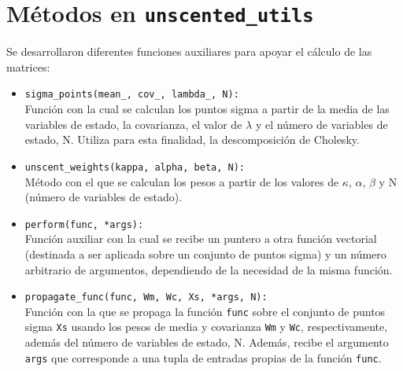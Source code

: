 \begin{appendix}
\begin{itemize}
\end{itemize} 
\pagebreak

\section{M\'etodos en \texttt{unscented\_utils}}
\label{ap:unsutils}
Se desarrollaron diferentes funciones auxiliares para apoyar el c\'alculo de las matrices:
\begin{itemize}
\item \texttt{sigma\_points(mean\_, cov\_, lambda\_, N):}\\
Funci\'on con la cual se calculan los puntos sigma a partir de la media de las variables de estado, la covarianza, el valor de $\lambda$ y el n\'umero de variables de estado, N. Utiliza para esta finalidad, la descomposici\'on de Cholesky.
\item \texttt{unscent\_weights(kappa, alpha, beta, N):}\\
M\'etodo con el que se calculan los pesos a partir de los valores de $\kappa$, $\alpha$, $\beta$ y N (n\'umero de variables de estado). 
\item \texttt{perform(func, *args):}\\
Funci\'on auxiliar con la cual se recibe un puntero a otra funci\'on vectorial (destinada a ser aplicada sobre un conjunto de puntos sigma) y un n\'umero arbitrario de argumentos, dependiendo de la necesidad de la misma funci\'on.
\item \texttt{propagate\_func(func, Wm, Wc, Xs, *args, N):}\\
Funci\'on con la que se propaga la funci\'on \texttt{func} sobre el conjunto de puntos sigma \texttt{Xs} usando los pesos de media y covarianza \texttt{Wm} y \texttt{Wc}, respectivamente, adem\'as del n\'umero de variables de estado, N. Adem\'as, recibe el argumento \texttt{args} que corresponde a una tupla de entradas propias de la funci\'on \texttt{func}. 
\end{itemize}
\pagebreak


\end{appendix}
